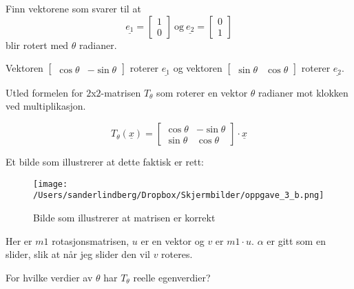 \documentclass[11pt, a4paper, norsk]{NTNUoving}
\begin{document}
    \begin{oppgave}
        \begin{punkt}
        Finn vektorene som svarer til at $$\underline{e_1} = \begin{bmatrix}
            1 \\
            0
        \end{bmatrix} \: \text{og} \: \underline{e_2} = \begin{bmatrix}
            0 \\
            1
        \end{bmatrix}$$ blir rotert med $\theta$ radianer.
        
        Vektoren $\begin{bmatrix}
            \cos{\theta} & -\sin{\theta} 
        \end{bmatrix}$ roterer $\underline{e_1}$ og vektoren $\begin{bmatrix}
            \sin{\theta} & \cos{\theta}
        \end{bmatrix}$ roterer $\underline{e_2}$.
        \end{punkt}
        \begin{punkt}
            Utled formelen for $2$x$2$-matrisen $T_{\theta}$ som roterer en vektor $\theta$ radianer mot klokken ved multiplikasjon.

            $$T_{\theta}(\underline{x}) = \begin{bmatrix}
                \cos{\theta} & -\sin{\theta} \\
                \sin{\theta} & \cos{\theta}
            \end{bmatrix} \cdot \underline{x}$$

            Et bilde som illustrerer at dette faktisk er rett:
            \begin{figure}[!ht]
                \centering
                \texttt{[image: /Users/sanderlindberg/Dropbox/Skjermbilder/oppgave\_3\_b.png]}
                \caption{Bilde som illustrerer at matrisen er korrekt}
                \label{fig:rotationMatrix}
            \end{figure}
            \FloatBarrier
            Her er $m1$ rotasjonsmatrisen, $u$ er en vektor og $v$ er $m1 \cdot u$. $\alpha$ er gitt som en slider, slik at når jeg slider den vil $v$ roteres.
        \end{punkt}
        \begin{punkt}
            For hvilke verdier av $\theta$ har $T_{\theta}$ reelle egenverdier?


\end{punkt}
\end{oppgave}
\end{document}
